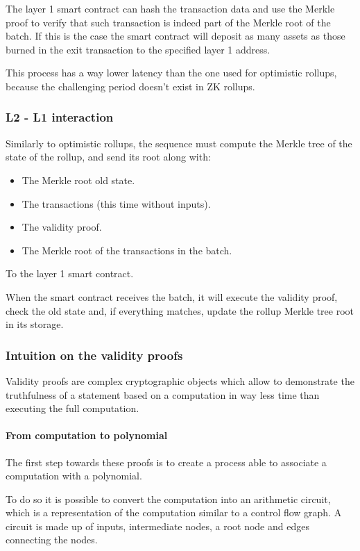\documentclass[12pt]{article}
\begin{document}
The layer 1 smart contract can hash the transaction data and use the Merkle proof to verify that such transaction is indeed part of the Merkle root of the batch. If this is the case the smart contract will deposit as many assets as those burned in the exit transaction to the specified layer 1 address.

This process has a way lower latency than the one used for optimistic rollups, because the challenging period doesn't exist in ZK rollups.

\subsubsection{L2 - L1 interaction} \label{subsubsection:zk_l2l1i}
Similarly to optimistic rollups, the sequence must compute the Merkle tree of the state of the rollup, and send its root along with:
\begin{itemize}
    \item The Merkle root old state. 
    \item The transactions (this time without inputs).
    \item The validity proof. 
    \item The Merkle root of the transactions in the batch. 
\end{itemize} 

To the layer 1 smart contract.

When the smart contract receives the batch, it will execute the validity proof, check the old state and, if everything matches, update the rollup Merkle tree root in its storage.

\subsubsection{Intuition on the validity proofs} \label{subsubsection:iotvp}
Validity proofs are complex cryptographic objects which allow to demonstrate the truthfulness of a statement based on a computation in way less time than executing the full computation.

\paragraph{From computation to polynomial}
The first step towards these proofs is to create a process able to associate a computation with a polynomial.

To do so it is possible to convert the computation into an arithmetic circuit, which is a representation of the computation similar to a control flow graph. A circuit is made up of inputs, intermediate nodes, a root node and edges connecting the nodes.
\end{document}
